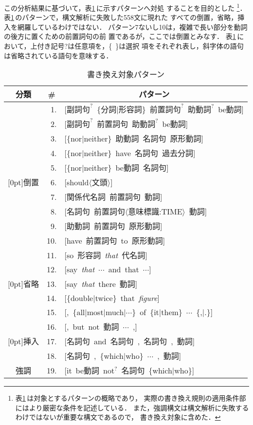 この分析結果に基づいて，表\ref{tab:illformedness}\,に示すパターンへ対処
することを目的とした
\footnote{表\ref{tab:illformedness}\,は対象とするパターンの概略であり，
実際の書き換え規則の適用条件部にはより厳密な条件を記述している．
また，強調構文は構文解析に失敗するわけではないが重要な構文であるので，
書き換え対象に含めた．}．
表\ref{tab:illformedness}\,のパターンで，構文解析に失敗した558文に現れた
すべての倒置，省略，挿入を網羅しているわけではない．
パターン7ないし10は，複雑で長い部分を動詞の後方に置くための前置詞句の前
置であるが，ここでは倒置とみなす．
表\ref{tab:illformedness}\,において，上付き記号?は任意項を，\{\ \}は選択
項をそれぞれ表し，斜字体の語句は省略されている語句を意味する．
\begin{table}[htbp]
\caption{書き換え対象パターン}
\label{tab:illformedness}
\begin{center}
\begin{tabular}{|c||r|l|}\hline
分類&\multicolumn{1}{c}{\#}&\multicolumn{1}{|c|}{パターン}\\\hline\hline
&  1.& [$副詞句^?$\ \{分詞$|$形容詞\}\ $前置詞句^?$\ $助動詞^?$\ be動詞] \\
&  2.& [$副詞句^?$\ 前置詞句\ $助動詞^?$\ be動詞] \\
&  3.& [\{nor$|$neither\}\ 助動詞\ 名詞句\ 原形動詞] \\
&  4.& [\{nor$|$neither\}\ have\ 名詞句\ 過去分詞] \\
&  5.& [\{nor$|$neither\}\ be動詞\ 名詞句] \\
\multicolumn{1}{|c||}{\raisebox{1.5ex}[0pt]{倒置}}
&  6.& [should$\langle$文頭$\rangle$] \\
&  7.& [関係代名詞\ 前置詞句\ 動詞] \\
&  8.& [名詞句\ 前置詞句$\langle$意味標識:TIME$\rangle$\ 動詞] \\
&  9.& [助動詞\ 前置詞句\ 原形動詞] \\
& 10.& [have\ 前置詞句\ to\ 原形動詞] \\\hline
& 11.& [so\ 形容詞\ {\it that}\ 代名詞] \\
& 12.& [say\ {\it that}\ $\cdots$\ and\ that\ $\cdots$] \\
\multicolumn{1}{|c||}{\raisebox{1.5ex}[0pt]{省略}}
& 13.& [say\ {\it that}\ there\ 動詞] \\
& 14.& [\{double$|$twice\}\ that\ {\it figure}] \\\hline
& 15.& [,\ \{all$|$most$|$much$|$$\cdots$\}\ of\ \{it$|$them\}\ $\cdots$\ \{,$|$.\}] \\
& 16.& [,\ but\ not\ 動詞\ $\cdots$\ ,] \\
\multicolumn{1}{|c||}{\raisebox{1.5ex}[0pt]{挿入}}
& 17.& [名詞句\ and\ 名詞句\ ,\ 名詞句\ ,\ 動詞] \\
& 18.& [名詞句\ ,\ \{which$|$who\}\ $\cdots$\ ,\ 動詞] \\\hline
強調& 19.& [it\ be動詞\ $\mbox{not}^?$\ 名詞句\ \{which$|$who\}] \\\hline
\end{tabular}
\end{center}
\end{table}

